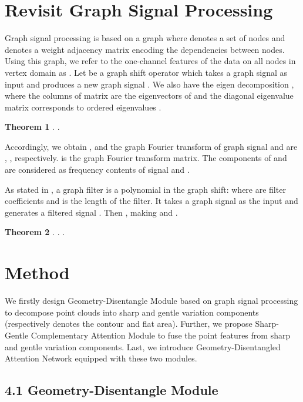 \documentclass[letterpaper]{article} \usepackage{aaai21}  \usepackage{times}  \usepackage{helvet} \usepackage{courier}  \usepackage[hyphens]{url}  \usepackage{graphicx} \urlstyle{rm} \def\UrlFont{\rm}  \usepackage{natbib}  \usepackage{caption} \frenchspacing  \setlength{\pdfpagewidth}{8.5in}  \setlength{\pdfpageheight}{11in}  \usepackage{color}
\begin{document}
\section{Revisit Graph Signal Processing}
 Graph signal processing \cite{graphsignal,discrete} is based on a graph  where  denotes a set of  nodes and  denotes a weight adjacency matrix encoding the dependencies between nodes. Using this graph, we refer to the one-channel features of the data on all nodes in vertex domain as .
Let  be a graph shift operator which takes a graph signal  as input and produces a new graph signal .
We also have the eigen decomposition 
, where the columns of matrix  are the eigenvectors of  and the diagonal eigenvalue matrix  corresponds to ordered eigenvalues . 

 \vspace*{0.4\baselineskip}
\noindent\textbf{Theorem 1} \cite{graphsignal,discrete}.
            .

 \vspace*{0.4\baselineskip}
Accordingly, we obtain , and
     the graph Fourier transform of graph signal  and  are , , respectively.  is the graph Fourier transform matrix. The components of
       and  are considered as frequency contents of signal  and .
      
As stated in \cite{discrete}, a graph filter is a polynomial in the graph shift: 
where  are filter coefficients and  is the length of the filter. It takes a graph signal  as the input and generates a filtered signal . Then , making  and . 

\vspace*{0.4\baselineskip}
\noindent\textbf{Theorem 2} \cite{graphsignal,discrete}.                  .      .
\section{Method}
We firstly design Geometry-Disentangle Module based on graph signal processing to decompose point clouds into sharp and gentle variation components (respectively denotes the contour and flat area). Further, we propose Sharp-Gentle Complementary Attention Module to fuse the point features from sharp and gentle variation components. Last, we introduce Geometry-Disentangled Attention Network equipped with these two modules.

\subsection{4.1 Geometry-Disentangle Module}\label{4.1}
\end{document}
